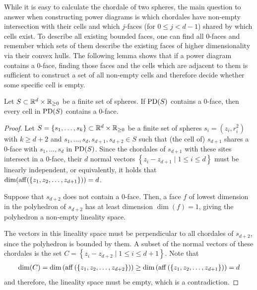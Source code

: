 While it is easy to calculate the chordale of two spheres, the main question to answer when constructing power diagrams is which chordales have non-empty intersection with their cells and which $j$-faces (for $0 \leq j < d - 1$) shared by which cells exist.
To describe all existing bounded faces, one can find all $0$-faces and remember which sets of them describe the existing faces of higher dimensionality via their convex hulls.
The following lemma shows that if a power diagram contains a $0$-face, finding those faces and the cells which are adjacent to them is sufficient to construct a set of all non-empty cells and therefore decide whether some specific cell is empty.

\begin{lemma}
    \label{lem:zerofaces}
    Let $S \subset \mathbb{R}^d \times \mathbb{R}_{\geq 0}$ be a finite set of spheres.
    If $\operatorname{PD}(S)$ contains a $0$-face, then every cell in $\operatorname{PD}(S)$ contains a $0$-face.
\end{lemma}
\begin{proof}
    Let $S = \left\{ s_1, \dots, s_k \right\} \subset \mathbb{R}^d \times \mathbb{R}_{\geq 0}$ be a finite set of spheres $s_i = (z_i, r_i^2)$ with $k \geq d+2$ and $s_1, \dots, s_d, s_{d+1}, s_{d+2} \in S$ such that (the cell of) $s_{d+1}$ shares a $0$-face with $s_1, \dots, s_d$ in $\operatorname{PD}(S)$.
    Since the chordales of $s_{d+1}$ with these sites intersect in a $0$-face, their $d$ normal vectors $\left\{  z_i - z_{d+1} \mid 1 \leq i \leq d\right\}$ must be linearly independent, or equivalently, it holds that $\dim(\operatorname{aff}(\left\{ z_1, z_2, \dots, z_{d+1} \right\})) = d$.

    Suppose that $s_{d+2}$ does not contain a $0$-face.
    Then, a face $f$ of lowest dimension in the polyhedron of $s_{d+2}$ has at least dimension $\dim(f) = 1$, giving the polyhedron a non-empty lineality space.

    The vectors in this lineality space must be perpendicular to all chordales of $s_{d+2}$, since the polyhedron is bounded by them.
    A subset of the normal vectors of these chordales is the set $C = \left\{ z_i - z_{d+2} \mid 1 \leq i \leq d+1 \right\}$.
    Note that
    \begin{align}
        \dim(C) = \dim \left( \operatorname{aff} \left( \left\{ z_1, z_2, \dots, z_{d+2} \right\} \right) \right) \geq \dim \left( \operatorname{aff} \left( \left\{ z_1, z_2, \dots, z_{d+1} \right\} \right) \right) = d
    \end{align}
    and therefore, the lineality space must be empty, which is a contradiction.
\end{proof}

